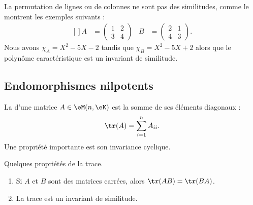 La permutation de lignes ou de colonnes ne sont pas des similitudes, comme le montrent les exemples suivants :
\begin{equation}
    \begin{aligned}[]
        A&=\begin{pmatrix}
            1    &   2    \\
            3    &   4
        \end{pmatrix}&
        B&=\begin{pmatrix}
            2    &   1    \\
            4    &   3
        \end{pmatrix}.
    \end{aligned}
\end{equation}
Nous avons \( \chi_A=X^2-5X-2\) tandis que \( \chi_B=X^2-5X+2\) alors que le polynôme caractéristique est un invariant de similitude.

\subsection{Endomorphismes nilpotents}

La  d'une matrice \( A\in \eM(n,\eK)\) est la somme de ses éléments diagonaux :
\begin{equation}
    \tr(A)=\sum_{i=1}^nA_{ii}.
\end{equation}
Une propriété importante est son invariance cyclique.

\begin{lemma}   \label{LemhbZTay}
    Quelques propriétés de la trace.
    \begin{enumerate}
        \item
    Si \( A\) et \( B\) sont des matrices carrées, alors \( \tr(AB)=\tr(BA)\).
\item
    La trace est un invariant de similitude.
    \end{enumerate}
\end{lemma}

